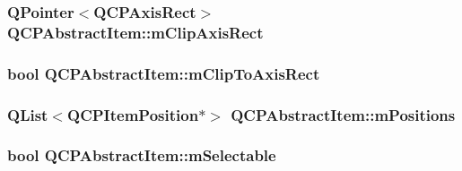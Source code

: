 \subsubsection[{\texorpdfstring{m\+Clip\+Axis\+Rect}{mClipAxisRect}}]{\setlength{\rightskip}{0pt plus 5cm}Q\+Pointer$<${\bf Q\+C\+P\+Axis\+Rect}$>$ Q\+C\+P\+Abstract\+Item\+::m\+Clip\+Axis\+Rect\hspace{0.3cm}{\ttfamily [protected]}}\hypertarget{classQCPAbstractItem_a3e57cfe7da4b1ac3d6fa7281ea437361}{}\label{classQCPAbstractItem_a3e57cfe7da4b1ac3d6fa7281ea437361}
\subsubsection[{\texorpdfstring{m\+Clip\+To\+Axis\+Rect}{mClipToAxisRect}}]{\setlength{\rightskip}{0pt plus 5cm}bool Q\+C\+P\+Abstract\+Item\+::m\+Clip\+To\+Axis\+Rect\hspace{0.3cm}{\ttfamily [protected]}}\hypertarget{classQCPAbstractItem_ad2a70ff6b658fcb84a9427f69d3f587d}{}\label{classQCPAbstractItem_ad2a70ff6b658fcb84a9427f69d3f587d}
\subsubsection[{\texorpdfstring{m\+Positions}{mPositions}}]{\setlength{\rightskip}{0pt plus 5cm}Q\+List$<${\bf Q\+C\+P\+Item\+Position}$\ast$$>$ Q\+C\+P\+Abstract\+Item\+::m\+Positions\hspace{0.3cm}{\ttfamily [protected]}}\hypertarget{classQCPAbstractItem_af94ff71b6a15ea6d028ab8bd8eccd012}{}\label{classQCPAbstractItem_af94ff71b6a15ea6d028ab8bd8eccd012}
\subsubsection[{\texorpdfstring{m\+Selectable}{mSelectable}}]{\setlength{\rightskip}{0pt plus 5cm}bool Q\+C\+P\+Abstract\+Item\+::m\+Selectable\hspace{0.3cm}{\ttfamily [protected]}}\hypertarget{classQCPAbstractItem_ad81eb35c8726a0f458db9df9732e0e41}{}\label{classQCPAbstractItem_ad81eb35c8726a0f458db9df9732e0e41}
